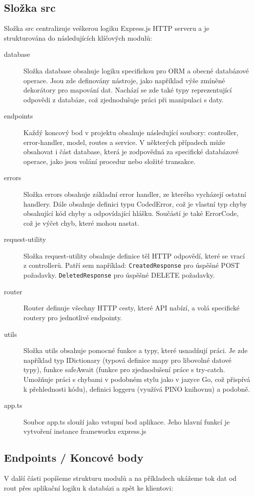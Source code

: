\subsection{Složka src}
Složka src centralizuje veškerou logiku Express.js HTTP serveru a je strukturována do následujících klíčových modulů:
\begin{description}
    \item[database] 
    Složka database obsahuje logiku specifickou pro ORM a obecné databázové operace. Jsou zde definovány nástroje, jako například výše zmíněné dekorátory pro mapování dat. Nachází se zde také typy reprezentující odpovědi z databáze, což zjednodušuje práci při manipulaci s daty.
    \item[endpoints]
    Každý koncový bod v projektu obsahuje následující soubory: controller, error-handler, model, routes a service. V některých případech může obsahovat i část database, která je zodpovědná za specifické databázové operace, jako jsou volání procedur nebo složité transakce.
    \item[errors] 
    Složka errors obsahuje základní error handler, ze kterého vycházejí ostatní handlery. Dále obsahuje definici typu CodedError, což je vlastní typ chyby obsahující kód chyby a odpovídající hlášku. Součástí je také ErrorCode, což je výčet chyb, které mohou nastat.
    \item[request-utility] 
    Složka request-utility obsahuje definice těl HTTP odpovědí, které se vrací z controllerů. Patří sem například:
    \texttt{CreatedResponse} pro úspěšné POST požadavky.
    \texttt{DeletedResponse} pro úspěšné DELETE požadavky.
    \item[router] 
    Router definuje všechny HTTP cesty, které API nabízí, a volá specifické routery pro jednotlivé endpointy.
    \item[utils] 
    Složka utils obsahuje pomocné funkce a typy, které usnadňují práci. Je zde například typ IDictionary (typová definice mapy pro libovolné datové typy), funkce safeAwait (funkce pro zjednodušení práce s try-catch. Umožňuje práci s chybami v podobném stylu jako v jazyce Go, což přispívá k přehlednosti kódu), definici loggeru (využívá PINO knihovnu) a podobně.
    \item[app.ts] 
    Soubor app.ts slouží jako vstupní bod aplikace. Jeho hlavní funkcí je vytvoření instance frameworku express.js
\end{description} 

\subsection{Endpoints / Koncové body}
V další části popíšeme strukturu modulů a na příkladech ukážeme tok dat od rout přes aplikační logiku k databázi a zpět ke klientovi:

